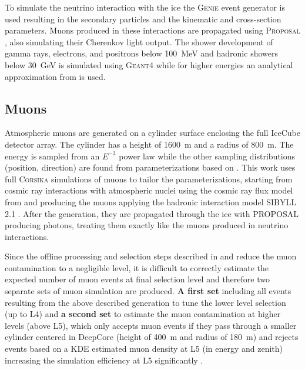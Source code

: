 To simulate the neutrino interaction with the ice the \textsc{Genie} event generator  is used resulting in the secondary particles and the kinematic and cross-section parameters. Muons produced in these interactions are propagated using \textsc{Proposal} , also simulating their Cherenkov light output. The shower development of gamma rays, electrons, and positrons below \SI{100}{\mega\electronvolt} and hadronic showers below \SI{30}{\giga\electronvolt} is simulated using \textsc{Geant4}  while for higher energies an analytical approximation from  is used.


\subsection{Muons}

Atmospheric muons are generated on a cylinder surface enclosing the full IceCube detector array. The cylinder has a height of \SI{1600}{\meter} and a radius of \SI{800}{\meter}. The energy is sampled from an $E^{-3}$ power law while the other sampling distributions (position, direction) are found from parameterizations based on . This work uses full \textsc{Corsika}  simulations of muons to tailor the parameterizations, starting from cosmic ray interactions with atmospheric nuclei using the cosmic ray flux model from  and producing the muons applying the hadronic interaction model SIBYLL 2.1 . After the generation, they are propagated through the ice with PROPOSAL producing photons, treating them exactly like the muons produced in neutrino interactions.

Since the offline processing and selection steps described in  and  reduce the muon contamination to a negligible level, it is difficult to correctly estimate the expected number of muon events at final selection level and therefore two separate sets of muon simulation are produced. \textbf{A first set} including all events resulting from the above described generation to tune the lower level selection (up to L4) and \textbf{a second set} to estimate the muon contamination at higher levels (above L5), which only accepts muon events if they pass through a smaller cylinder centered in DeepCore (height of \SI{400}{\meter} and radius of \SI{180}{\meter}) and rejects events based on a KDE estimated muon density at L5 (in energy and zenith) increasing the simulation efficiency at L5 significantly .



